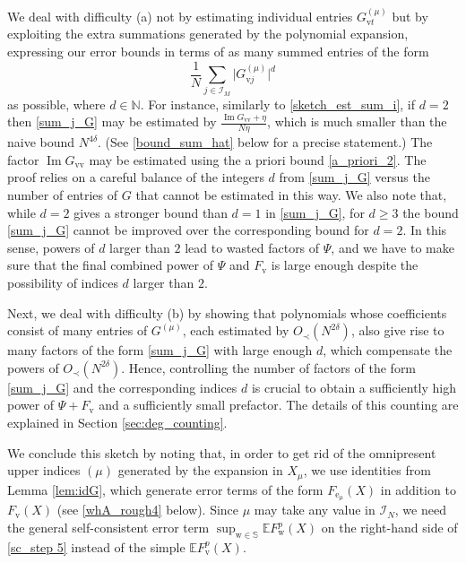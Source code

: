 \documentclass[11pt]{article} %
\numberwithin{equation}{section}
\numberwithin{figure}{section}
\theoremstyle{plain} %
\theoremstyle{definition} %
\newcommand{\f}[1]{\boldsymbol{\mathrm{#1}}} %
\newcommand{\bb}{\mathbb} %
\renewcommand{\cal}{\mathcal}
\newcommand{\E}{\mathbb{E}}
\newcommand{\N}{\mathbb{N}}
\renewcommand{\geq}{\geqslant}
\newcommand{\abs}[1]{\lvert #1 \rvert}
\DeclareMathOperator{\im}{Im}
\begin{document}
We deal with difficulty (a) not by estimating individual entries $G_{\f v t}^{(\mu)}$ but by exploiting the extra summations generated by the polynomial expansion, expressing our error bounds in terms of as many summed entries of the form
\begin{equation} \label{sum_j_G}
\frac{1}{N} \sum_{j \in \cal I_M} \abs{G_{\f v j}^{(\mu)}}^d
\end{equation}
as possible, where $d \in \N$. For instance, similarly to \eqref{sketch_est_sum_i}, if $d = 2$ then \eqref{sum_j_G} may be estimated by $\frac{\im G_{\f v \f v} + \eta}{N \eta}$, which is much smaller than the naive bound $N^{4 \delta}$. (See \eqref{bound_sum_hat} below for a precise statement.) The factor $\im G_{\f v \f v}$ may be estimated using the a priori bound \eqref{a_priori_2}. The proof relies on a careful balance of the integers $d$ from \eqref{sum_j_G} versus the number of entries of $G$ that cannot be estimated in this way. We also note that, while $d = 2$ gives a stronger bound than $d = 1$ in \eqref{sum_j_G}, for $d \geq 3$ the bound \eqref{sum_j_G} cannot be improved over the corresponding bound for $d = 2$. In this sense, powers of $d$ larger than $2$ lead to wasted factors of $\Psi$, and we have to make sure that the final combined power of $\Psi$ and $F_{\f v}$ is large enough despite the possibility of indices $d$ larger than $2$.

Next, we deal with difficulty (b) by showing that polynomials whose coefficients consist of many entries of $G^{(\mu)}$, each estimated by $O_\prec(N^{2 \delta})$, also give rise to many factors of the form \eqref{sum_j_G} with large enough $d$, which compensate the powers of $O_\prec(N^{2 \delta})$. Hence, controlling the number of factors of the form \eqref{sum_j_G} and the corresponding indices $d$ is crucial to obtain a sufficiently high power of $\Psi + F_{\f v}$ and a sufficiently small prefactor. The details of this counting are explained in Section \ref{sec:deg_counting}.

We conclude this sketch by noting that, in order to get rid of the omnipresent upper indices $(\mu)$ generated by the expansion in $X_\mu$, we use identities from Lemma \ref{lem:idG}, which generate error terms of the form $F_{\f e_\mu}(X)$ in addition to $F_{\f v}(X)$ (see \eqref{whA_rough4} below). Since $\mu$ may take any value in $\cal I_N$, we need the general self-consistent error term $\sup_{\f w \in \bb S} \E F_{\f w}^p(X)$ on the right-hand side of \eqref{sc_step 5} instead of the simple $\E F_{\f v}^p(X)$.
\end{document}
